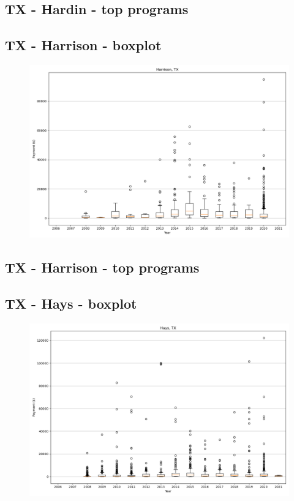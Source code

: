 \subsection*{TX - Hardin - top programs}

\newpage
\subsection*{TX - Harrison - boxplot}
\begin{figure}[h]
\centering
\includegraphics[width=7in]{../output/boxplots/counties/Harrison-TX_boxplot.png}
\end{figure}


\subsection*{TX - Harrison - top programs}

\newpage
\subsection*{TX - Hays - boxplot}
\begin{figure}[h]
\centering
\includegraphics[width=7in]{../output/boxplots/counties/Hays-TX_boxplot.png}
\end{figure}


